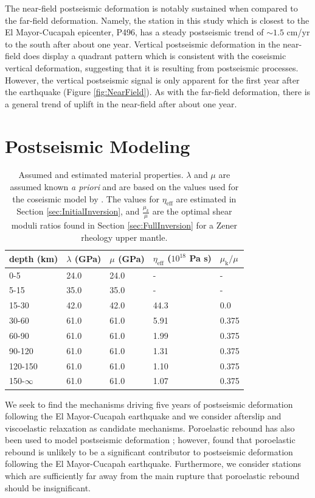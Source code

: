 \documentclass[draft,linenumbers]{AGUJournal}
\begin{document}
The near-field postseismic deformation is notably sustained when compared to the far-field deformation.  Namely, the station in this study which is closest to the El Mayor-Cucapah epicenter, P496, has a steady postseismic trend of ${\sim}1.5$ cm/yr to the south after about one year.  Vertical postseismic deformation in the near-field does display a quadrant pattern which is consistent with the coseismic vertical deformation, suggesting that it is resulting from postseismic processes.  However, the vertical postseismic signal is only apparent for the first year after the earthquake (Figure \ref{fig:NearField}).  As with the far-field deformation, there is a general trend of uplift in the near-field after about one year. 

\section{Postseismic Modeling}\label{sec:Model}

\begin{table}\label{tab:MaterialProperties}
\begin{tabular} {l l l l l}
depth (km) &$\lambda$ (GPa)&$\mu$ (GPa)&$\eta_\mathrm{eff}$ ($10^{18}$ Pa s) & $\mu_\mathrm{k}/\mu$\\ \hline
0-5 & 24.0 & 24.0 & - & -\\
5-15 & 35.0 & 35.0 & - & -\\
15-30 & 42.0 & 42.0 & 44.3 & 0.0\\
30-60 & 61.0 & 61.0 & 5.91 & 0.375\\
60-90 & 61.0 & 61.0 & 1.99 & 0.375\\
90-120 & 61.0 & 61.0 & 1.31 & 0.375\\
120-150 & 61.0 & 61.0 & 1.10 & 0.375\\
150-$\infty$ & 61.0 & 61.0 & 1.07 & 0.375\\
\end{tabular}
\caption{Assumed and estimated material properties. $\lambda$ and $\mu$ are assumed known \textit{a priori} and are based on the values used for the coseismic model by \citet{Wei2011}.  The values for $\eta_\mathrm{eff}$ are estimated in Section \ref{sec:InitialInversion}, and $\frac{\mu_k}{\mu}$ are the optimal shear moduli ratios found in Section \ref{sec:FullInversion} for a Zener rheology upper mantle.} 

\end{table}
We seek to find the mechanisms driving five years of postseismic deformation following the El Mayor-Cucapah earthquake and we consider afterslip and viscoelastic relaxation as candidate mechanisms.  Poroelastic rebound has also been used to model postseismic deformation \citep[e.g.][]{Jonsson2003}; however, \citet{Gonzalez-ortega2014} found that poroelastic rebound is unlikely to be a significant contributor to postseismic deformation following the El Mayor-Cucapah earthquake. Furthermore, we consider stations which are sufficiently far away from the main rupture that poroelastic rebound should be insignificant.  
\end{document}
